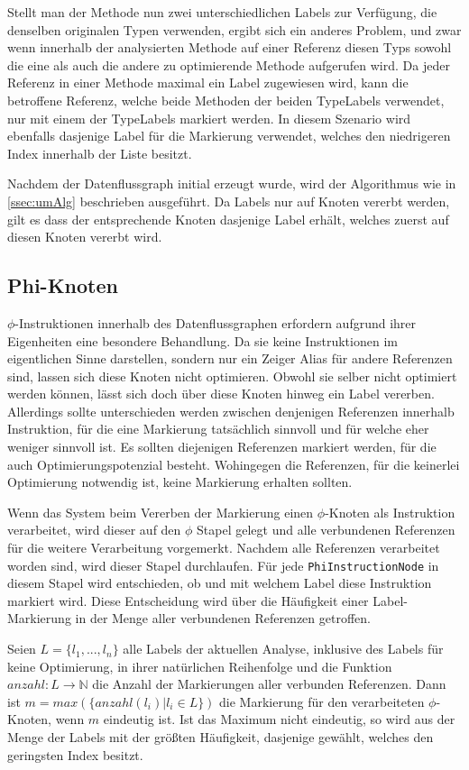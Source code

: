 Stellt man der Methode nun zwei unterschiedlichen Labels zur Verfügung, die denselben 
originalen Typen verwenden, ergibt sich ein anderes Problem, und zwar wenn 
innerhalb der analysierten Methode auf einer Referenz diesen Typs sowohl die eine 
als auch die andere zu optimierende Methode aufgerufen wird. Da jeder Referenz in 
einer Methode maximal ein Label zugewiesen wird, kann die betroffene Referenz, welche 
beide Methoden der beiden TypeLabels verwendet, nur mit einem der TypeLabels markiert werden. 
In diesem Szenario wird ebenfalls dasjenige Label für die Markierung verwendet, welches den niedrigeren
Index innerhalb der Liste besitzt.

Nachdem der Datenflussgraph initial erzeugt wurde, wird der Algorithmus wie in \ref{ssec:umAlg} 
beschrieben ausgeführt. Da Labels nur auf Knoten vererbt werden, gilt es dass der entsprechende
Knoten dasjenige Label erhält, welches zuerst auf diesen Knoten vererbt wird.  

\subsection{Phi-Knoten}

$\phi$-Instruktionen innerhalb des Datenflussgraphen erfordern aufgrund ihrer Eigenheiten
eine besondere Behandlung. Da sie keine Instruktionen im eigentlichen Sinne darstellen, sondern
nur ein Zeiger Alias für andere Referenzen sind, lassen sich diese Knoten nicht
optimieren. Obwohl sie selber nicht optimiert werden können, lässt sich doch über diese 
Knoten hinweg ein Label vererben. Allerdings sollte unterschieden werden zwischen denjenigen 
Referenzen innerhalb Instruktion, für die eine Markierung tatsächlich sinnvoll und für 
welche eher weniger sinnvoll ist. Es sollten diejenigen Referenzen markiert werden, für die 
auch Optimierungspotenzial besteht. Wohingegen die Referenzen, für die keinerlei 
Optimierung notwendig ist, keine Markierung erhalten sollten. 

Wenn das System beim Vererben der Markierung einen $\phi$-Knoten als Instruktion verarbeitet,
wird dieser auf den $\phi$ Stapel gelegt und alle verbundenen Referenzen für die
weitere Verarbeitung vorgemerkt. Nachdem alle Referenzen verarbeitet worden sind, wird dieser
Stapel durchlaufen. Für jede \texttt{PhiInstructionNode} in diesem Stapel wird entschieden,
ob und mit welchem Label diese Instruktion markiert wird. Diese Entscheidung wird über
die Häufigkeit einer Label-Markierung in der Menge aller verbundenen Referenzen 
getroffen. 

Seien $L = \{l_1,...,l_n\}$ alle Labels der aktuellen Analyse, inklusive des Labels 
für keine Optimierung, in ihrer natürlichen Reihenfolge und die Funktion 
$anzahl: L \rightarrow \mathbb{N}$ die Anzahl der Markierungen aller verbunden Referenzen. 
Dann ist $m = max(\{anzahl(l_i) | l_i \in L\})$ die Markierung für den verarbeiteten $\phi$-Knoten, 
wenn $m$ eindeutig ist. Ist das Maximum nicht eindeutig, so wird aus der Menge der 
Labels mit der größten Häufigkeit, dasjenige gewählt, welches den geringsten Index besitzt. 